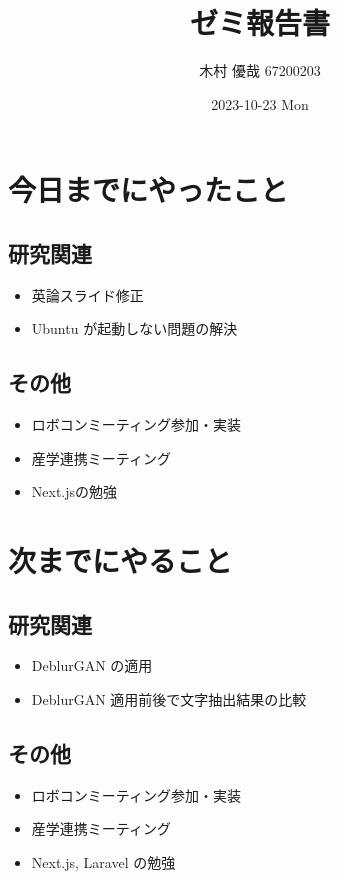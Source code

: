\documentclass[uplatex, onecolumn, 10pt]{jsarticle}
\begin{document}
\title{\vspace{-40mm}\bf{\LARGE{ゼミ報告書}}}
\author{\vspace{-40mm}木村 優哉 67200203}
\date{2023-10-23 Mon}
\maketitle


\section{今日までにやったこと}

\subsection*{研究関連}
\begin{itemize}
	\item 英論スライド修正
	\item Ubuntu が起動しない問題の解決
\end{itemize}

\subsection*{その他}
\begin{itemize}
	\item ロボコンミーティング参加・実装
	\item 産学連携ミーティング
	\item Next.jsの勉強
\end{itemize}


\section{次までにやること}

\subsection*{研究関連}
\begin{itemize}
	\item DeblurGAN の適用
	\item DeblurGAN 適用前後で文字抽出結果の比較
\end{itemize}

\subsection*{その他}
\begin{itemize}
	\item ロボコンミーティング参加・実装
	\item 産学連携ミーティング
	\item Next.js, Laravel の勉強
\end{itemize}
\end{document}
